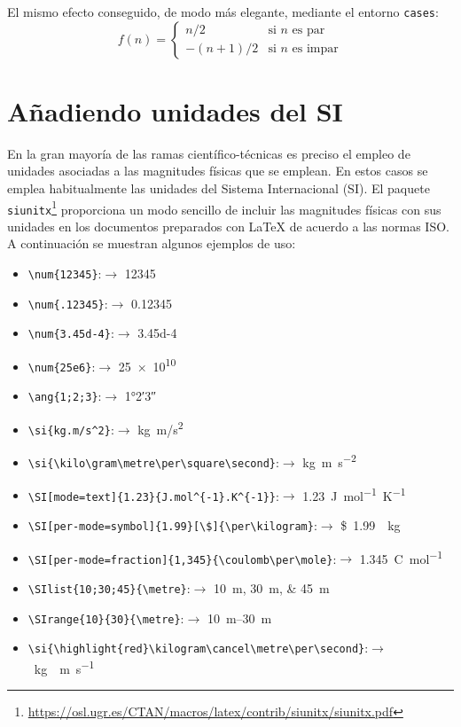 \documentclass[11pt,a4paper]{article}
\begin{document}
\noindent El mismo efecto conseguido, de modo más elegante, mediante el entorno \texttt{cases}:
\[
f(n) =  
\begin{cases}
  n/2      & \text{si $n$ es par}\\
  -(n+1)/2 & \text{si $n$ es impar}
\end{cases} 
\]





\section{Añadiendo unidades del SI}
En la gran mayoría de las ramas científico-técnicas es preciso el empleo de unidades asociadas a las magnitudes físicas que se emplean. En estos casos se emplea habitualmente las unidades del Sistema Internacional (SI). El paquete \texttt{siunitx}\footnote{\url{https://osl.ugr.es/CTAN/macros/latex/contrib/siunitx/siunitx.pdf}} proporciona un modo sencillo de incluir las magnitudes físicas con sus unidades en los documentos preparados con \LaTeX{} de acuerdo a las normas ISO. A continuación se muestran algunos ejemplos de uso:

\begin{itemize}[noitemsep]
	\item \verb|\num{12345}|:$\rightarrow$ \num{12345}
	\item \verb|\num{.12345}|:$\rightarrow$  \num{.12345}
	\item \verb|\num{3.45d-4}|:$\rightarrow$  \num{3.45d-4}
	\item \verb|\num{25e6}|:$\rightarrow$  \num{25e10}
	\item \verb|\ang{1;2;3}|:$\rightarrow$  \ang{1;2;3}
	\item \verb|\si{kg.m/s^2}|:$\rightarrow$  \si{kg.m/s^2}
	\item \verb|\si{\kilo\gram\metre\per\square\second}|:$\rightarrow$  \si{\kilo\gram\metre\per\square\second}
	\item \verb|\SI[mode=text]{1.23}{J.mol^{-1}.K^{-1}}|:$\rightarrow$  \SI[mode=text]{1.23}{J.mol^{-1}.K^{-1}}
	\item \verb|\SI[per-mode=symbol]{1.99}[\$]{\per\kilogram}|:$\rightarrow$  \SI[per-mode=symbol]{1.99}[\$]{\per\kilogram}
	\item \verb|\SI[per-mode=fraction]{1,345}{\coulomb\per\mole}|:$\rightarrow$  \SI[per-mode=fraction]{1,345}{\coulomb\per\mole}
	\item \verb|\SIlist{10;30;45}{\metre}|:$\rightarrow$  \SIlist{10;30;45}{\metre}
	\item \verb|\SIrange{10}{30}{\metre}|:$\rightarrow$  \SIrange{10}{30}{\metre}
	\item \verb|\si{\highlight{red}\kilogram\cancel\metre\per\second}|:$\rightarrow$  \si{\kilogram\cancel\metre\per\second}
\end{itemize}
\end{document}
